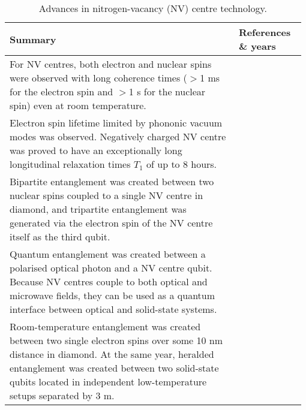 \begin{table*}[!htbp]
	\begin{tabular}{|p{0.755\linewidth}|p{0.22\linewidth}|}
		\hline
		Summary & References \& years \\
		\hline \hline
		For NV centres, both electron and nuclear spins were observed with long coherence times ($>$1 ms for the electron spin and $>$1 s for the nuclear spin) even at room temperature. &  \cite{bib:balasubramanian2009ultralong, bib:neumann2010quantum, bib:maurer2012room} \\
		\hline
		Electron spin lifetime limited by phononic vacuum modes was observed. Negatively charged NV centre was proved to have an exceptionally long longitudinal relaxation times $T_1$\index{T$_1$-time} of up to 8 hours. & \cite{bib:astner2018solid} \\
		\hline
		Bipartite entanglement was created between two nuclear spins coupled to a single NV centre in diamond, and tripartite entanglement was generated via the electron spin of the NV centre itself as the third qubit. & \cite{bib:neumann2008multipartite} \\
		\hline
		Quantum entanglement was created between a polarised optical photon and a NV centre qubit. Because NV centres couple to both optical and microwave fields, they can be used as a quantum interface between optical and solid-state systems.  & \cite{bib:togan2010quantum}\\
		\hline
		Room-temperature entanglement was created between two single electron spins over some 10 nm distance in diamond. At the same year, heralded entanglement was created between two solid-state qubits located in independent low-temperature setups separated by 3 m. & \cite{bib:dolde2013room, bib:bernien2013heralded} \\
		\hline
	\end{tabular}
	\captionspacetab \caption{Advances in nitrogen-vacancy (NV) centre technology.} \label{tab:NV_centres}
\end{table*}

